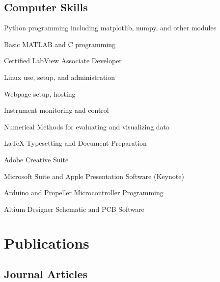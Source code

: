 \documentclass[letterpaper]{article}
\renewenvironment{itemize}{
  \begin{list}{}{
    \setlength{\leftmargin}{1.5em}
  }
}{
  \end{list}
}
\begin{document}
\subsection*{Computer Skills}

\begin{itemize}
\item Python programming including matplotlib, numpy, and other modules 
\item Basic MATLAB and C programming
\item Certified LabView Associate Developer
\item Linux use, setup, and administration
\item Webpage setup, hosting
\item Instrument monitoring and control
\item Numerical Methods for evaluating and visualizing data
\item \LaTeX{} Typesetting and Document Preparation
\item Adobe Creative Suite
\item Microsoft Suite and Apple Presentation Software (Keynote)
\item Arduino and Propeller Microcontroller Programming
\item Altium Designer Schematic and PCB Software
\end{itemize}



\section*{Publications}

\subsection*{Journal Articles}
\end{document}
